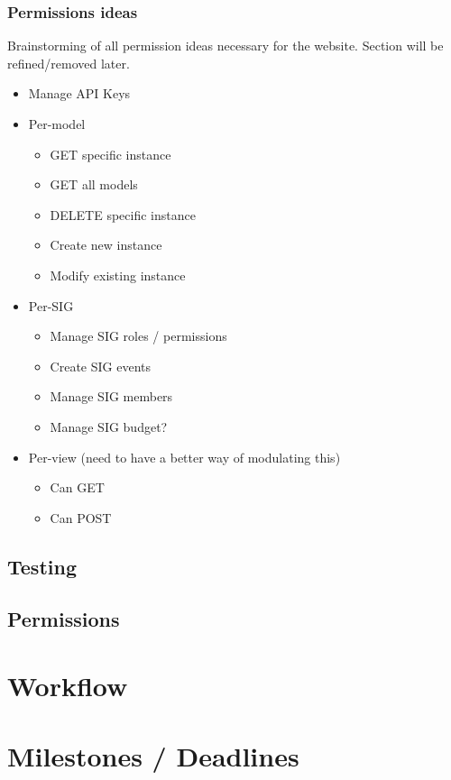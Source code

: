 \documentclass{article}
\begin{document}
\subsubsection{Permissions ideas}
Brainstorming of all permission ideas necessary for the website. Section will be
refined/removed later.
\begin{itemize}
    \item Manage API Keys
    \item Per-model
    \begin{itemize}
        \item GET specific instance
        \item GET all models
        \item DELETE specific instance
        \item Create new instance
        \item Modify existing instance
    \end{itemize}

    \item Per-SIG
    \begin{itemize}
        \item Manage SIG roles / permissions
        \item Create SIG events
        \item Manage SIG members
        \item Manage SIG budget?
    \end{itemize}

    \item Per-view (need to have a better way of modulating this)
    \begin{itemize}
        \item Can GET
        \item Can POST
    \end{itemize}


\end{itemize}
\subsection{Testing}
\subsection{Permissions}

\section{Workflow}

\section{Milestones / Deadlines}
\end{document}
